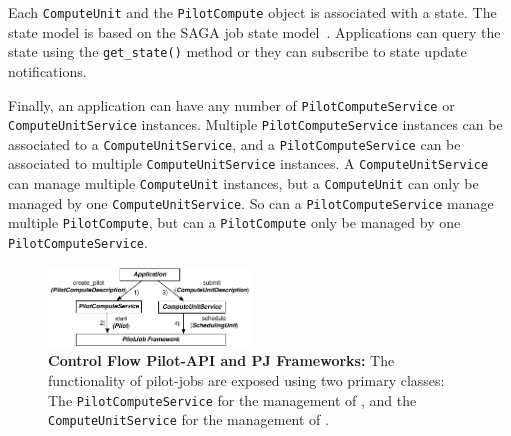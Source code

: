 \documentclass{sig-alternate}
\begin{document}


Each \texttt{Compute\-Unit} and the \texttt{Pilot\-Compute} object is associated
with a state.
The state model is based on the SAGA job state model~\cite{ogf-gfd-90}.
Applications can query the state using the \texttt{get\_state()} method or they
can subscribe to state update notifications.

Finally, an application can have any number of \texttt{Pilot\-Compute\-Service} or
\texttt{Compute\-Unit\-Service} instances.
Multiple \texttt{Pilot\-Compute\-Service} instances can be associated to a
\texttt{Compute\-Unit\-Service}, and a \texttt{Pilot\-Compute\-Service} can be associated to
multiple \texttt{Compute\-Unit\-Service} instances.
A \texttt{Compute\-Unit\-Service} can manage multiple \texttt{Compute\-Unit}
instances, but a \texttt{Compute\-Unit} can only be managed by one
\texttt{Compute\-Unit\-Service}.
So can a \texttt{Pilot\-Compute\-Service} manage
multiple \texttt{Pilot\-Compute}, but can a \texttt{Pilot\-Compute} only be
managed by one \texttt{Pilot\-Compute\-Service}.


\begin{figure}[t]
	\centering
  \upp
		\includegraphics[width=0.48\textwidth]{figures/pilot-api-flow.pdf}
	\caption{\textbf{Control Flow Pilot-API and PJ Frameworks:} The 
	functionality of pilot-jobs are exposed using two primary classes: The 
	\texttt{Pilot\-Compute\-Service} for the management 
	of \pilots, and the \texttt{Compute\-Unit\-Service} for the management of 
	\cus. \upp
	}
	\label{fig:figures_pilot_api_flow}
\end{figure}
\end{document}
